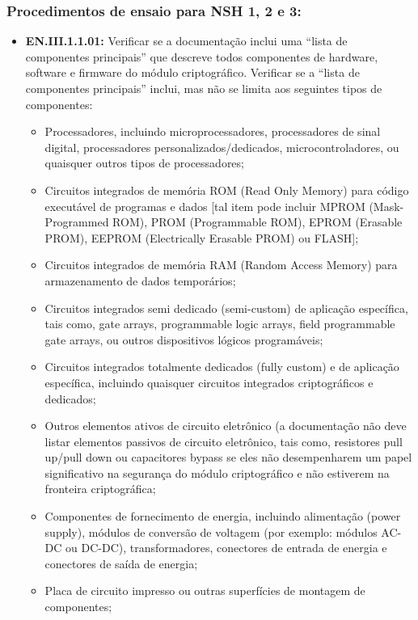 \documentclass[12pt, a4paper]{article}
\begin{document}
    \subsubsection*{Procedimentos de ensaio para NSH 1, 2 e 3:}
    \begin{itemize}[leftmargin=*, nosep]
        \item \textbf{EN.III.1.1.01:} Verificar se a documentação inclui uma “lista de componentes principais” que descreve todos componentes de hardware, software e firmware do módulo criptográfico. Verificar se a “lista de componentes principais” inclui, mas não se limita aos seguintes tipos de componentes:
        \begin{itemize}
            \item Processadores, incluindo microprocessadores, processadores de sinal digital, processadores  personalizados/dedicados, microcontroladores, ou quaisquer outros tipos de processadores;
            \item Circuitos integrados de memória ROM (Read Only Memory) para código executável de programas e dados [tal item pode incluir MPROM (Mask-Programmed ROM), PROM (Programmable ROM), EPROM (Erasable PROM), EEPROM (Electrically Erasable PROM) ou FLASH];
            \item Circuitos integrados de memória RAM (Random Access Memory) para armazenamento de dados temporários;
            \item Circuitos integrados semi dedicado (semi-custom) de aplicação específica, tais como, gate arrays, programmable logic arrays, field programmable gate arrays, ou outros dispositivos lógicos programáveis;
            \item Circuitos integrados totalmente dedicados (fully custom) e de aplicação específica, incluindo quaisquer circuitos integrados criptográficos e dedicados;
            \item Outros elementos ativos de circuito eletrônico (a documentação não deve listar elementos passivos de circuito eletrônico, tais como, resistores pull up/pull down ou capacitores bypass se eles não desempenharem um papel significativo na segurança do módulo criptográfico e não estiverem na fronteira criptográfica;
            \item Componentes de fornecimento de energia, incluindo alimentação (power supply), módulos de conversão de voltagem (por exemplo: módulos AC-DC ou DC-DC), transformadores, conectores de entrada de energia e conectores de saída de energia;
            \item Placa de circuito impresso ou outras superfícies de montagem de componentes;

\end{itemize}
\end{itemize}
\end{document}
